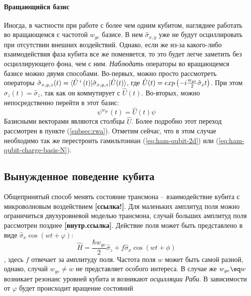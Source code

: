 \documentclass[12pt, twoside]{report}
\DeclarePairedDelimiter\bra{\langle}{\rvert}
\DeclarePairedDelimiter\ket{\lvert}{\rangle}
\numberwithin{equation}{section}
\numberwithin{figure}{section}
\begin{document}
\paragraph{Вращающийся базис} Иногда, в частности при работе с более чем одним кубитом, нагляднее работать во вращающемся с частотой $w_{ge}$ базисе. В нем $\hat{\sigma}_{x,y}$ уже не будут осциллировать при отсутствии внешних воздействий. Однако, если же из-за какого-либо взаимодействия  фаза кубита все же поменяется, то это будет легче заметить без осциллирующего фона, чем с ним. 
\newline
\textit{Наблюдать} операторы во вращающемся базисе можно двумя способами.
\newline
Во-первых, можно просто рассмотреть операторы $ \hat{\sigma}_{x,y,z}(t) = \bra{\hat{U}^+(t)}\hat{\sigma}_{x,y,z}\ket{\hat{U}(t)}$, где $\hat{U}(t) \nolinebreak=\nolinebreak exp\left(- i \frac{w_{ge}}{2} \hat{\sigma}_z t \right)$. При этом $\hat{\sigma}_z(t) = \hat{\sigma}_z$, так как он коммутирует с $\hat{U}(t)$.
\newline
\linebreak
Во-вторых, можно непосредственно перейти в этот базис:
\begin{equation}
\psi^{w_{ge}}(t) = \hat{U}(t) \psi
\end{equation}
Базисными векторами являются столбцы $\hat{U}$. Более подробно этот переход рассмотрен в пункте (\ref{subsec:rwa}). Отметим сейчас, что в этом случае необходимо так же перестроить гамильтониан (\ref{eq:ham-qubit-2d}) или (\ref{eq:ham-qubit-charge-basis-N}).


\subsection{Вынужденное поведение кубита}
Общепринятый способ менять состояние трансмона -- взаимодействие кубита с микроволновым воздействием \textbf{[ссылка!]}. Для маленьких амплитуд поля можно ограничиться двухуровневой моделью трансмона, случай больших амплитуд поля рассмотрен позднее \textbf{[внутр.ссылка]}. Действие поля может быть представлено в виде $\hat{\sigma}_x \cos (w t + \varphi)$:
\begin{equation}
\hat{H} =  \frac{\hbar w_{ge}}{2} \hat{\sigma}_z + f \hat{\sigma}_x \cos \left(w t + \phi\right)
\end{equation}
, здесь $f$ отвечает за амплитуду поля. Частота поля $w$ может быть самой разной, однако, случай $w_{ge} \neq w$ не представляет особого интереса. В случае же $w_{ge} \eq w$ возникает резонанс уровней кубита и возникают \textit{осцилляции Раби}. В зависимости от $\varphi$ будет происходит вращение состояний
\end{document}
